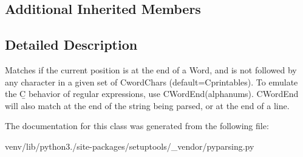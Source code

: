 \subsection*{Additional Inherited Members}


\subsection{Detailed Description}
\begin{DoxyVerb}Matches if the current position is at the end of a Word, and
is not followed by any character in a given set of C{wordChars}
(default=C{printables}). To emulate the C{\b} behavior of regular expressions,
use C{WordEnd(alphanums)}. C{WordEnd} will also match at the end of
the string being parsed, or at the end of a line.
\end{DoxyVerb}
 

The documentation for this class was generated from the following file\+:\begin{DoxyCompactItemize}
\item 
venv/lib/python3./site-\/packages/setuptools/\+\_\+vendor/pyparsing.\+py\end{DoxyCompactItemize}
